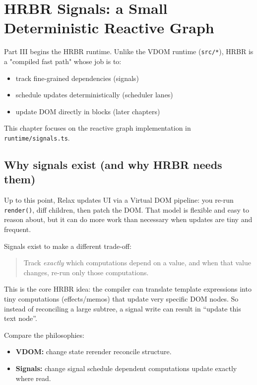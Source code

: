 \chapter{HRBR Signals: a Small Deterministic Reactive Graph}

Part III begins the HRBR runtime. Unlike the VDOM runtime (\texttt{src/*}), HRBR is a "compiled fast path" whose job is to:

\begin{itemize}
  \item track fine-grained dependencies (signals)
  \item schedule updates deterministically (scheduler lanes)
  \item update DOM directly in blocks (later chapters)
\end{itemize}

This chapter focuses on the reactive graph implementation in \texttt{runtime/signals.ts}.

\section{Why signals exist (and why HRBR needs them)}

Up to this point, Relax updates UI via a Virtual DOM pipeline: you re-run \texttt{render()}, diff children, then patch the DOM.
That model is flexible and easy to reason about, but it can do more work than necessary when updates are tiny and frequent.

Signals exist to make a different trade-off:

\begin{quote}
Track \emph{exactly} which computations depend on a value, and when that value changes, re-run only those computations.
\end{quote}

This is the core HRBR idea: the compiler can translate template expressions into tiny computations (effects/memos) that update very specific DOM nodes.
So instead of reconciling a large subtree, a signal write can result in “update this text node”.

Compare the philosophies:

\begin{itemize}
  \item \textbf{VDOM:} change state \textrightarrow rerender \textrightarrow reconcile structure.
  \item \textbf{Signals:} change signal \textrightarrow schedule dependent computations \textrightarrow update exactly where read.
\end{itemize}

